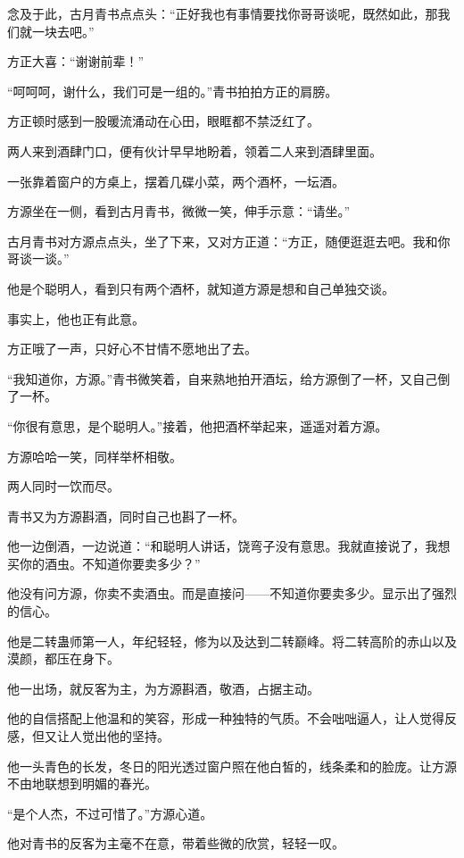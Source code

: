 \begin{this_body}
念及于此，古月青书点点头：“正好我也有事情要找你哥哥谈呢，既然如此，那我们就一块去吧。”

方正大喜：“谢谢前辈！”

“呵呵呵，谢什么，我们可是一组的。”青书拍拍方正的肩膀。

方正顿时感到一股暖流涌动在心田，眼眶都不禁泛红了。

两人来到酒肆门口，便有伙计早早地盼着，领着二人来到酒肆里面。

一张靠着窗户的方桌上，摆着几碟小菜，两个酒杯，一坛酒。

方源坐在一侧，看到古月青书，微微一笑，伸手示意：“请坐。”

古月青书对方源点点头，坐了下来，又对方正道：“方正，随便逛逛去吧。我和你哥谈一谈。”

他是个聪明人，看到只有两个酒杯，就知道方源是想和自己单独交谈。

事实上，他也正有此意。

方正哦了一声，只好心不甘情不愿地出了去。

“我知道你，方源。”青书微笑着，自来熟地拍开酒坛，给方源倒了一杯，又自己倒了一杯。

“你很有意思，是个聪明人。”接着，他把酒杯举起来，遥遥对着方源。

方源哈哈一笑，同样举杯相敬。

两人同时一饮而尽。

青书又为方源斟酒，同时自己也斟了一杯。

他一边倒酒，一边说道：“和聪明人讲话，饶弯子没有意思。我就直接说了，我想买你的酒虫。不知道你要卖多少？”

他没有问方源，你卖不卖酒虫。而是直接问——不知道你要卖多少。显示出了强烈的信心。

他是二转蛊师第一人，年纪轻轻，修为以及达到二转巅峰。将二转高阶的赤山以及漠颜，都压在身下。

他一出场，就反客为主，为方源斟酒，敬酒，占据主动。

他的自信搭配上他温和的笑容，形成一种独特的气质。不会咄咄逼人，让人觉得反感，但又让人觉出他的坚持。

他一头青色的长发，冬日的阳光透过窗户照在他白皙的，线条柔和的脸庞。让方源不由地联想到明媚的春光。

“是个人杰，不过可惜了。”方源心道。

他对青书的反客为主毫不在意，带着些微的欣赏，轻轻一叹。

\end{this_body}

